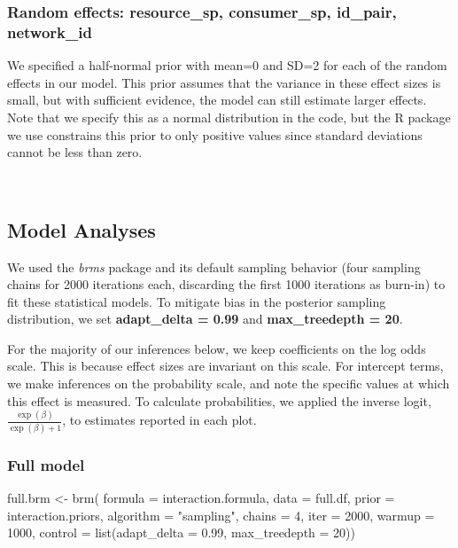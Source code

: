 \documentclass[11pt,]{article}
\newenvironment{Shaded}{}{}
\newcommand{\KeywordTok}[1]{\textcolor[rgb]{0.00,0.00,1.00}{#1}}
\newcommand{\DataTypeTok}[1]{#1}
\newcommand{\DecValTok}[1]{#1}
\newcommand{\FloatTok}[1]{#1}
\newcommand{\StringTok}[1]{\textcolor[rgb]{0.00,0.50,0.50}{#1}}
\newcommand{\NormalTok}[1]{#1}
\begin{document}
\subsubsection{Random effects: resource\_sp, consumer\_sp, id\_pair,
network\_id}\label{random-effects-resource_sp-consumer_sp-id_pair-network_id}

We specified a half-normal prior with mean=0 and SD=2 for each of the
random effects in our model. This prior assumes that the variance in
these effect sizes is small, but with sufficient evidence, the model can
still estimate larger effects. Note that we specify this as a normal
distribution in the code, but the R package we use constrains this prior
to only positive values since standard deviations cannot be less than
zero.

~

\subsection{Model Analyses}\label{model-analyses}

We used the \emph{brms} package \citep{Burkner2017} and its default
sampling behavior (four sampling chains for 2000 iterations each,
discarding the first 1000 iterations as burn-in) to fit these
statistical models. To mitigate bias in the posterior sampling
distribution, we set \textbf{adapt\_delta = 0.99} and
\textbf{max\_treedepth = 20}.

For the majority of our inferences below, we keep coefficients on the
log odds scale. This is because effect sizes are invariant on this
scale. For intercept terms, we make inferences on the probability scale,
and note the specific values at which this effect is measured. To
calculate probabilities, we applied the inverse logit,
\(\frac{\exp(\beta)}{\exp(\beta)+1}\), to estimates reported in each
plot.

\subsubsection{Full model}\label{full-model}

\begin{Shaded}
\begin{Highlighting}[]
\NormalTok{full.brm <-}\StringTok{ }\KeywordTok{brm}\NormalTok{(}
  \DataTypeTok{formula =}\NormalTok{ interaction.formula, }\DataTypeTok{data =}\NormalTok{ full.df, }
  \DataTypeTok{prior =}\NormalTok{ interaction.priors, }\DataTypeTok{algorithm =} \StringTok{"sampling"}\NormalTok{, }
  \DataTypeTok{chains =} \DecValTok{4}\NormalTok{, }\DataTypeTok{iter =} \DecValTok{2000}\NormalTok{, }\DataTypeTok{warmup =} \DecValTok{1000}\NormalTok{, }
  \DataTypeTok{control =} \KeywordTok{list}\NormalTok{(}\DataTypeTok{adapt_delta =} \FloatTok{0.99}\NormalTok{, }\DataTypeTok{max_treedepth =} \DecValTok{20}\NormalTok{))}
\end{Highlighting}
\end{Shaded}
\end{document}
